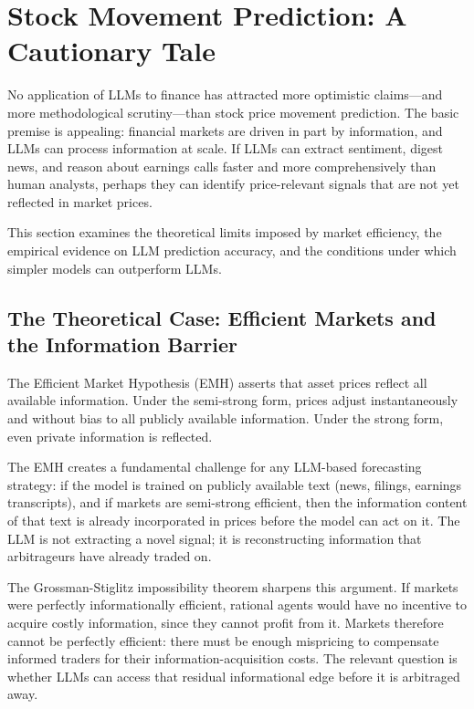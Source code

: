 \section{Stock Movement Prediction: A Cautionary Tale}
\label{sec:ch13-stock-movement-prediction}

No application of LLMs to finance has attracted more optimistic claims---and more
methodological scrutiny---than stock price movement prediction. The basic premise is
appealing: financial markets are driven in part by information, and LLMs can process
information at scale. If LLMs can extract sentiment, digest news, and reason about
earnings calls faster and more comprehensively than human analysts, perhaps they can
identify price-relevant signals that are not yet reflected in market prices.

This section examines the theoretical limits imposed by market efficiency, the empirical
evidence on LLM prediction accuracy, and the conditions under which simpler models
can outperform LLMs.

\subsection{The Theoretical Case: Efficient Markets and the Information Barrier}
\label{sec:ch13-efficient-markets-information-barrier}

The Efficient Market Hypothesis (EMH) \cite{fama1970efficient, fama1991efficient}
asserts that asset prices reflect all available information. Under the semi-strong form,
prices adjust instantaneously and without bias to all publicly available information.
Under the strong form, even private information is reflected.

The EMH creates a fundamental challenge for any LLM-based forecasting strategy: if the
model is trained on publicly available text (news, filings, earnings transcripts), and
if markets are semi-strong efficient, then the information content of that text is
already incorporated in prices before the model can act on it. The LLM is not extracting
a novel signal; it is reconstructing information that arbitrageurs have already traded on.

The Grossman-Stiglitz impossibility theorem \cite{grossman1980impossibility} sharpens
this argument. If markets were perfectly informationally efficient, rational agents would
have no incentive to acquire costly information, since they cannot profit from it.
Markets therefore cannot be perfectly efficient: there must be enough mispricing to
compensate informed traders for their information-acquisition costs. The relevant
question is whether LLMs can access that residual informational edge before it
is arbitraged away.

